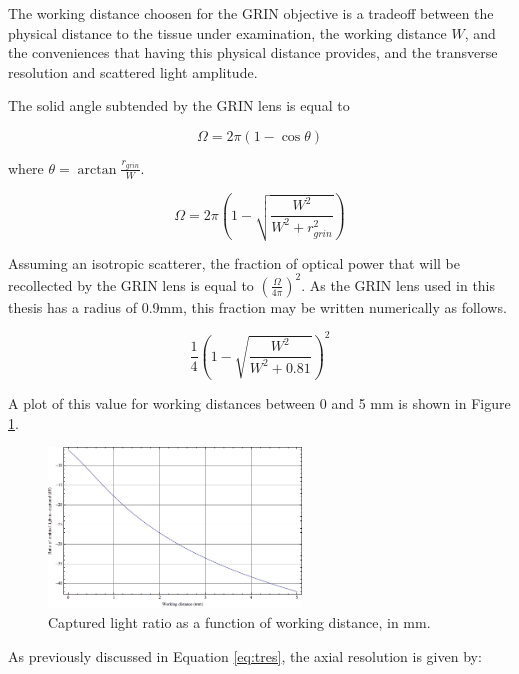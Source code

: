 The working distance choosen for the GRIN objective is a tradeoff between the physical distance to the tissue under examination, the working distance $W$, and the conveniences that having this physical distance provides, and the transverse resolution and scattered light amplitude.


The solid angle subtended by the GRIN lens is equal to

\begin{equation}
\Omega = 2 \pi (1 - \cos{\theta})
\end{equation}

where $\theta = \arctan{\frac{r_{grin}}{W}}$.

\begin{equation}
\Omega = 2 \pi \left(1 - \sqrt{\frac{W^2}{W^2 + r_{grin}^2}} \right)
\end{equation}

Assuming an isotropic scatterer, the fraction of optical power that will be recollected by the GRIN lens is equal to $ \left( \frac{\Omega}{4 \pi} \right)^2 $. As the GRIN lens used in this thesis has a radius of 0.9mm, this fraction may be written numerically as follows.

\begin{equation}
\frac{1}{4} \left( 1 - \sqrt{\frac{W^2}{W^2 + 0.81}} \right) ^ 2
\end{equation}

A plot of this value for working distances between 0 and 5 mm is shown in Figure \ref{fig:wd}.

\begin{figure}[h!]
\centering
\includegraphics[width=0.6\textwidth]{Images/System/grin_scattering.png}
\caption{Captured light ratio as a function of working distance, in mm. \label{fig:wd}}
\end{figure}

As previously discussed in Equation \ref{eq:tres}, the axial resolution is given by:

